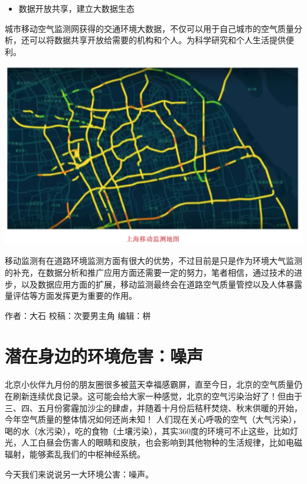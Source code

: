 \documentclass[
]{book}
\providecommand{\tightlist}{%
  \setlength{\itemsep}{0pt}\setlength{\parskip}{0pt}}
\begin{document}
\begin{itemize}
\tightlist
\item
  数据开放共享，建立大数据生态
\end{itemize}

城市移动空气监测网获得的交通环境大数据，不仅可以用于自己城市的空气质量分析，还可以将数据共享开放给需要的机构和个人。为科学研究和个人生活提供便利。

\includegraphics[width=6.67in]{images/dlyd5}

移动监测有在道路环境监测方面有很大的优势，不过目前是只是作为环境大气监测的补充，在数据分析和推广应用方面还需要一定的努力，笔者相信，通过技术的进步，以及数据应用方面的扩展，移动监测最终会在道路空气质量管控以及人体暴露量评估等方面发挥更为重要的作用。

作者：大石
校稿：次要男主角
编辑：栟

\hypertarget{ux6f5cux5728ux8eabux8fb9ux7684ux73afux5883ux5371ux5bb3ux566aux58f0}{%
\section{潜在身边的环境危害：噪声}\label{ux6f5cux5728ux8eabux8fb9ux7684ux73afux5883ux5371ux5bb3ux566aux58f0}}

北京小伙伴九月份的朋友圈很多被蓝天幸福感霸屏，直至今日，北京的空气质量仍在刷新连续优良记录。这可能会给大家一种感觉，北京的空气污染治好了！但由于三、四、五月份雾霾加沙尘的肆虐，并随着十月份后秸秆焚烧、秋末供暖的开始，今年空气质量的整体情况如何还尚未知！
人们现在关心呼吸的空气（大气污染），喝的水（水污染），吃的食物（土壤污染），其实360度的环境可不止这些，比如灯光，人工白昼会伤害人的眼睛和皮肤，也会影响到其他物种的生活规律，比如电磁辐射，能够紊乱我们的中枢神经系统。

今天我们来说说另一大环境公害：噪声。
\end{document}
